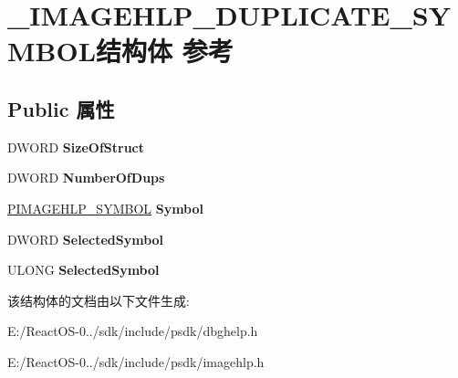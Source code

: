 \hypertarget{struct___i_m_a_g_e_h_l_p___d_u_p_l_i_c_a_t_e___s_y_m_b_o_l}{}\section{\+\_\+\+I\+M\+A\+G\+E\+H\+L\+P\+\_\+\+D\+U\+P\+L\+I\+C\+A\+T\+E\+\_\+\+S\+Y\+M\+B\+O\+L结构体 参考}
\label{struct___i_m_a_g_e_h_l_p___d_u_p_l_i_c_a_t_e___s_y_m_b_o_l}
\subsection*{Public 属性}
\begin{DoxyCompactItemize}
\item 
\mbox{\label{struct___i_m_a_g_e_h_l_p___d_u_p_l_i_c_a_t_e___s_y_m_b_o_l_a729182e8af7fa0f99f1ccb3765f3dc84}} 
D\+W\+O\+RD {\bfseries Size\+Of\+Struct}
\item 
\mbox{\label{struct___i_m_a_g_e_h_l_p___d_u_p_l_i_c_a_t_e___s_y_m_b_o_l_a7946faddac9c42a5b5e1cad0902a59e0}} 
D\+W\+O\+RD {\bfseries Number\+Of\+Dups}
\item 
\mbox{\label{struct___i_m_a_g_e_h_l_p___d_u_p_l_i_c_a_t_e___s_y_m_b_o_l_a90ae4d90b54900672f176ea71e5429bc}} 
\hyperlink{struct___i_m_a_g_e_h_l_p___s_y_m_b_o_l}{P\+I\+M\+A\+G\+E\+H\+L\+P\+\_\+\+S\+Y\+M\+B\+OL} {\bfseries Symbol}
\item 
\mbox{\label{struct___i_m_a_g_e_h_l_p___d_u_p_l_i_c_a_t_e___s_y_m_b_o_l_aeb1b2eaae1d757a38d4692f1af3f58ac}} 
D\+W\+O\+RD {\bfseries Selected\+Symbol}
\item 
\mbox{\label{struct___i_m_a_g_e_h_l_p___d_u_p_l_i_c_a_t_e___s_y_m_b_o_l_a1558293e3277cfee37875bba8751c43a}} 
U\+L\+O\+NG {\bfseries Selected\+Symbol}
\end{DoxyCompactItemize}


该结构体的文档由以下文件生成\+:\begin{DoxyCompactItemize}
\item 
E\+:/\+React\+O\+S-\/0../sdk/include/psdk/dbghelp.\+h\item 
E\+:/\+React\+O\+S-\/0../sdk/include/psdk/imagehlp.\+h\end{DoxyCompactItemize}
